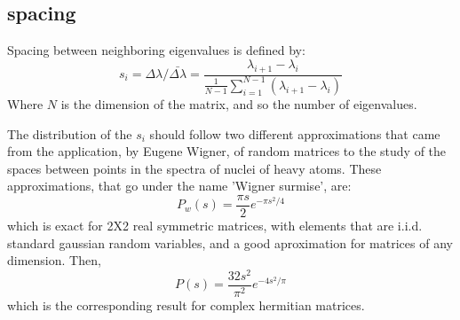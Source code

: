 \documentclass[prb,9pt,notitlepage]{revtex4-1}
\begin{document}
\subsection{spacing}
Spacing between neighboring eigenvalues is defined by:
\begin{equation}
  s_i = \Delta \lambda / \bar{\Delta \lambda} = \frac{\lambda_{i+1}-\lambda_i}{\frac{1}{N-1}\sum_{i=1}^{N-1}(\lambda_{i+1}-\lambda_i)} \nonumber
\end{equation}
Where $N$ is the dimension of the matrix, and so the number of eigenvalues.

The distribution of the $s_i$ should follow two different approximations that came from the application, by Eugene Wigner, of random matrices to the study of the spaces between points in the spectra of nuclei of heavy atoms. These approximations, that go under the name 'Wigner surmise', are:
\begin{equation}
  P_w(s) = \frac{\pi s}{2}e^{-\pi s^2/4} \label{wigner1}
\end{equation}
which is exact for 2X2 real symmetric matrices, with elements that are i.i.d. standard gaussian random variables, and a good aproximation for matrices of any dimension. Then,
\begin{equation}
  P(s) = \frac{32s^2}{\pi^2}e^{-4s^2/\pi} \label{wigner2}
\end{equation}
which is the corresponding result for complex hermitian matrices.
\end{document}
